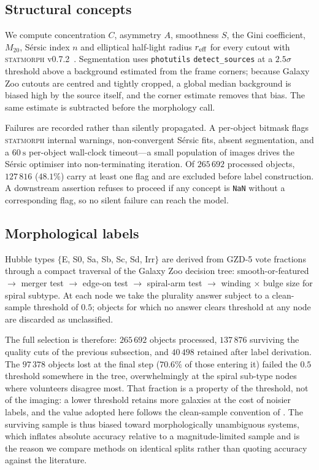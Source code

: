 \documentclass[11pt]{article}
\newcommand{\code}[1]{\texttt{\small #1}}
\begin{document}
\subsection{Structural concepts}

We compute concentration $C$, asymmetry $A$, smoothness $S$, the Gini
coefficient, $M_{20}$, Sérsic index $n$ and elliptical half-light radius
$r_{\rm eff}$ for every cutout with \textsc{statmorph}
v0.7.2~\citep{rodriguez2019}. Segmentation uses \code{photutils}
\code{detect\_sources} at a $2.5\sigma$ threshold above a background estimated
from the frame corners; because Galaxy Zoo cutouts are centred and tightly
cropped, a global median background is biased high by the source itself, and
the corner estimate removes that bias. The same estimate is subtracted before
the morphology call.

Failures are recorded rather than silently propagated. A per-object bitmask
flags \textsc{statmorph} internal warnings, non-convergent Sérsic fits, absent
segmentation, and a $\SI{60}{\second}$ per-object wall-clock timeout---a small
population of images drives the Sérsic optimiser into non-terminating
iteration. Of $265\,692$ processed objects, $127\,816$ ($48.1\%$) carry at
least one flag and are excluded before label construction. A downstream
assertion refuses to proceed if any concept is \code{NaN} without a
corresponding flag, so no silent failure can reach the model.

\subsection{Morphological labels}

Hubble types $\{$E, S0, Sa, Sb, Sc, Sd, Irr$\}$ are derived from GZD-5 vote
fractions through a compact traversal of the Galaxy Zoo decision tree:
smooth-or-featured $\rightarrow$ merger test $\rightarrow$ edge-on test
$\rightarrow$ spiral-arm test $\rightarrow$ winding $\times$ bulge size for
spiral subtype. At each node we take the plurality answer subject to a
clean-sample threshold of $0.5$; objects for which no answer clears threshold
at any node are discarded as unclassified.

The full selection is therefore: $265\,692$ objects processed, $137\,876$
surviving the quality cuts of the previous subsection, and $40\,498$
retained after label derivation. The $97\,378$ objects lost at the final
step ($70.6\%$ of those entering it) failed the $0.5$ threshold somewhere in
the tree, overwhelmingly at the spiral sub-type nodes where volunteers
disagree most. That fraction is a property of the threshold, not of the
imaging: a lower threshold retains more galaxies at the cost of noisier
labels, and the value adopted here follows the clean-sample convention of
\citet{walmsley2022}. The surviving sample is thus biased toward
morphologically unambiguous systems, which inflates absolute accuracy
relative to a magnitude-limited sample and is the reason we compare methods
on identical splits rather than quoting accuracy against the literature.
\end{document}
